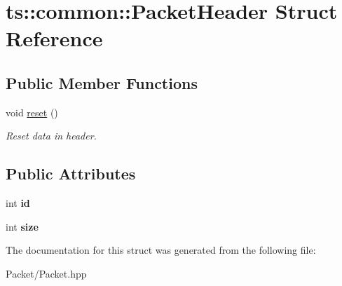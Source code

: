 \hypertarget{structts_1_1common_1_1_packet_header}{}\section{ts\+:\+:common\+:\+:Packet\+Header Struct Reference}
\label{structts_1_1common_1_1_packet_header}
\subsection*{Public Member Functions}
\begin{DoxyCompactItemize}
\item 
\mbox{\label{structts_1_1common_1_1_packet_header_adf4e5e691171eeac8d38f8d0ddf3e138}} 
void \hyperlink{structts_1_1common_1_1_packet_header_adf4e5e691171eeac8d38f8d0ddf3e138}{reset} ()
\begin{DoxyCompactList}\small\item\em Reset data in header. \end{DoxyCompactList}\end{DoxyCompactItemize}
\subsection*{Public Attributes}
\begin{DoxyCompactItemize}
\item 
\mbox{\label{structts_1_1common_1_1_packet_header_a95214ffcb1c52edd7a6282c2e6a40025}} 
int {\bfseries id}
\item 
\mbox{\label{structts_1_1common_1_1_packet_header_a5dc7af4be3fbff0ca3756202450fe882}} 
int {\bfseries size}
\end{DoxyCompactItemize}


The documentation for this struct was generated from the following file\+:\begin{DoxyCompactItemize}
\item 
Packet/Packet.\+hpp\end{DoxyCompactItemize}
